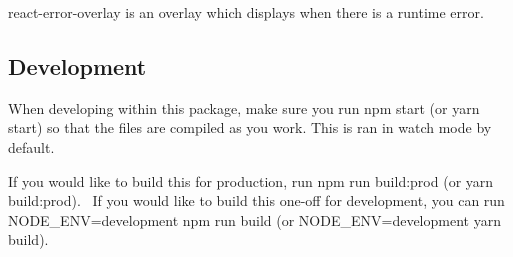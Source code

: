 {\ttfamily react-\/error-\/overlay} is an overlay which displays when there is a runtime error.

\subsection*{Development}

When developing within this package, make sure you run {\ttfamily npm start} (or {\ttfamily yarn start}) so that the files are compiled as you work. This is ran in watch mode by default.

If you would like to build this for production, run {\ttfamily npm run build\+:prod} (or {\ttfamily yarn build\+:prod}).~\newline
 If you would like to build this one-\/off for development, you can run {\ttfamily N\+O\+D\+E\+\_\+\+E\+NV=development npm run build} (or {\ttfamily N\+O\+D\+E\+\_\+\+E\+NV=development yarn build}). 